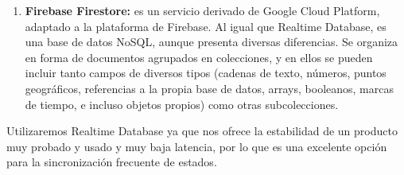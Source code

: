 \begin{enumerate}
\item \textbf{Firebase Firestore:} es un servicio derivado de Google Cloud Platform, adaptado a la plataforma de Firebase. Al igual que Realtime Database, es una base de datos NoSQL, aunque presenta diversas diferencias. Se organiza en forma de documentos agrupados en colecciones, y en ellos se pueden incluir tanto campos de diversos tipos (cadenas de texto, números, puntos geográficos, referencias a la propia base de datos, arrays, booleanos, marcas de tiempo, e incluso objetos propios) como otras subcolecciones.

\end{enumerate}

Utilizaremos Realtime Database ya que nos ofrece la estabilidad de un producto muy probado y usado y muy baja latencia, por lo que es una excelente opción para la sincronización frecuente de estados.